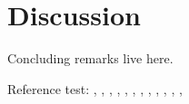 \section{Discussion}
\label{sec:discussion}

Concluding remarks live here.

Reference test:
\cite{ArcherWest2003},
\cite{UNKNOWN},
\cite{ArcherWest2003},
\cite{Chaetal2009},
\cite{Chuetal2006},
\cite{Clarketal2011},
\cite{Halletal1996},
\cite{Horriganetal2002},
\cite{Lewisetal2011},
\cite{Maleckaretal2009},
\cite{Nygrenetal1998},
\cite{Tsugaetal2001},


